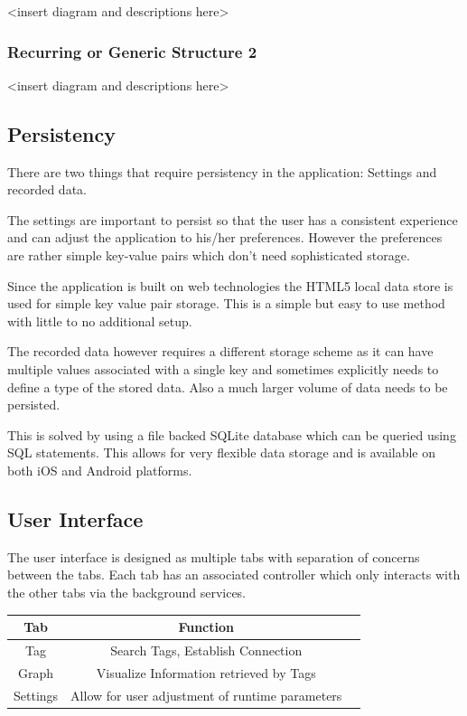 \documentclass[]{article}
\begin{document}
\textless{}insert diagram and descriptions here\textgreater{}

\subsubsection{Recurring or Generic Structure 2}

\textless{}insert diagram and descriptions here\textgreater{}

\subsection{Persistency}

There are two things that require persistency in the application: Settings and recorded data.

The settings are important to persist so that the user has a consistent experience and can adjust the application to his/her preferences. However the preferences are rather simple key-value pairs which don't need sophisticated storage.

Since the application is built on web technologies the HTML5 local data store is used for simple key value pair storage. This is a simple but easy to use method with little to no additional setup.

The recorded data however requires a different storage scheme as it can have multiple values associated with a single key and sometimes explicitly needs to define a type of the stored data. Also a much larger volume of data needs to be persisted. 

This is solved by using a file backed SQLite database which can be queried using SQL statements. This allows for very flexible data storage and is available on both iOS and Android platforms.

\subsection{User Interface}

The user interface is designed as multiple tabs with separation of concerns between the tabs. Each tab has an associated controller which only interacts with the other tabs via the background services. 

\begin{tabular}{|c|c|c|}
\hline
 Tab & Function\\
 \hline
 Tag & Search Tags, Establish Connection \\
 Graph & Visualize Information retrieved by Tags \\
 Settings & Allow for user adjustment of runtime parameters\\
 \hline
\end{tabular}
\end{document}
